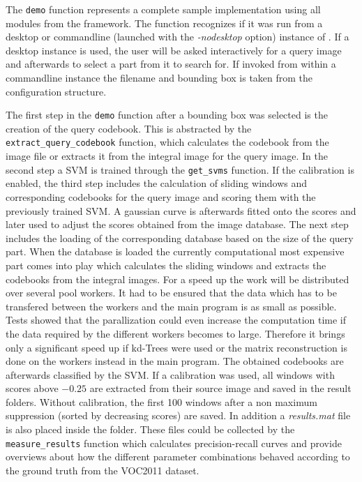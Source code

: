 The \verb|demo| function represents a complete sample implementation using all modules from the framework. The function recognizes if it was run from a desktop or commandline (launched with the \textit{-nodesktop} option) instance of \MATLAB. If a desktop instance is used, the user will be asked interactively for a query image and afterwards to select a part from it to search for. If invoked from within a commandline instance the filename and bounding box is taken from the configuration structure.

The first step in the \verb|demo| function after a bounding box was selected is the creation of the query codebook. This is abstracted by the \verb|extract_query_codebook| function, which calculates the codebook from the image file or extracts it from the integral image for the query image. In the second step a \ac{SVM} is trained through the \verb|get_svms| function. If the calibration is enabled, the third step includes the calculation of sliding windows and corresponding codebooks for the query image and scoring them with the previously trained \ac{SVM}. A gaussian curve is afterwards fitted onto the scores and later used to adjust the scores obtained from the image database. The next step includes the loading of the corresponding database based on the size of the query part. When the database is loaded the currently computational most expensive part comes into play which calculates the sliding windows and extracts the codebooks from the integral images. For a speed up the work will be distributed over several pool workers. It had to be ensured that the data which has to be transfered between the workers and the main program is as small as possible. Tests showed that the parallization could even increase the computation time if the data required by the different workers becomes to large. Therefore it brings only a significant speed up if kd-Trees were used or the matrix reconstruction is done on the workers instead in the main program. The obtained codebooks are afterwards classified by the \ac{SVM}. If a calibration was used, all windows with scores above $-0.25$ are extracted from their source image and saved in the result folders. Without calibration, the first 100 windows after a non maximum suppression (sorted by decreasing scores) are saved. In addition a \textit{results.mat} file is also placed inside the folder. These files could be collected by the \verb|measure_results| function which calculates precision-recall curves and provide overviews about how the different parameter combinations behaved according to the ground truth from the \ac{VOC2011} dataset.

